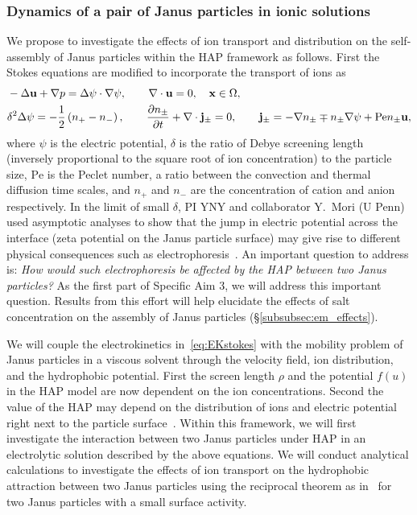 \subsubsection{Dynamics of a pair of Janus particles in ionic
solutions\label{subsubsec:JP_electrolyte}}
We propose to investigate the effects of ion transport and distribution
on the self-assembly of Janus particles within the HAP framework as
follows. First the Stokes equations are modified to incorporate the
transport of ions as
\begin{equation}
\label{eq:EKstokes}
\begin{aligned}
  &-\Delta \mathbf{u} + \nabla p = \Delta\psi\cdot\nabla\psi, \qquad
  \nabla \cdot \mathbf{u} = 0,  \quad \mathbf{x} \in \Omega,\\
  &\delta^2\Delta\psi = -\frac{1}{2}\left(n_+-n_-\right),\qquad
  \frac{\partial n_{\pm}}{\partial t} + \nabla\cdot{\bf j}_{\pm} = 0,\qquad {\bf j}_{\pm} = -\nabla n_{\pm} \mp n_{\pm} \nabla\psi + \mbox{Pe} n_{\pm}\mathbf{u},
\end{aligned}
\end{equation}
where $\psi$ is the electric potential, $\delta$ is the ratio of Debye
screening length (inversely proportional to the square root of ion
concentration) to the particle size, $\mbox{Pe}$ is the Peclet number, a
ratio between the convection and thermal diffusion time scales, and
$n_{+}$ and $n_{-}$ are the concentration of cation and anion respectively.
In the limit
of small $\delta$, PI YNY and collaborator Y.~Mori (U Penn) used
asymptotic analyses to show that the jump in electric potential across
the interface (zeta potential on the Janus particle surface) may give
rise to different physical consequences such as
electrophoresis~\cite{Mori2018_JFM}.
%
An important question to address is: {\it How would such electrophoresis
be affected by the HAP between two Janus particles?} As the first part
of Specific Aim 3, we will address this important question. Results from
this effort will help elucidate the effects of salt concentration on the
assembly of Janus particles (\S\ref{subsubsec:em_effects}).

We will couple the electrokinetics in~\eqref{eq:EKstokes} with the
mobility problem of Janus particles in a viscous solvent through the
velocity field, ion distribution, and the hydrophobic potential. First
the screen length $\rho$ and the potential $f(u)$ in the HAP model are now 
dependent on  the ion concentrations. 
%
Second the value of the HAP may depend on the distribution of ions and
electric potential right next to the particle
surface~\cite{Mori2018_JFM}. Within this framework, we will first
investigate the interaction between two Janus particles under HAP in an
electrolytic solution described by the above equations. We will conduct
analytical calculations to investigate the effects of ion transport on
the hydrophobic attraction between two Janus particles using the
reciprocal theorem as in~\cite{BayatiNajafi2016_JCP} for two Janus
particles with a small surface activity.


